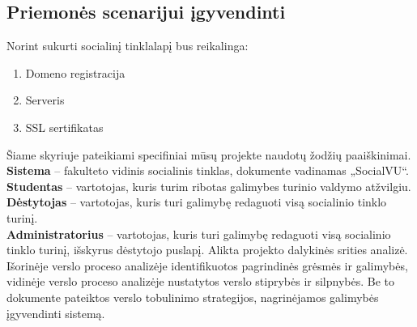 \documentclass{VUMIFPSkursinis}
\begin{document}
\subsection{Priemonės scenarijui įgyvendinti}
Norint sukurti socialinį tinklalapį bus reikalinga:
\begin{enumerate}
	\item Domeno registracija
	\item Serveris
	\item SSL sertifikatas
\end{enumerate}
\newpage
{}
Šiame skyriuje pateikiami specifiniai mūsų projekte naudotų žodžių paaiškinimai. \\
\textbf{Sistema} – fakulteto vidinis socialinis tinklas, dokumente vadinamas „SocialVU“. \\
\textbf{Studentas} – vartotojas, kuris turim ribotas galimybes turinio valdymo atžvilgiu.\\
\textbf{Dėstytojas} – vartotojas, kuris turi galimybę redaguoti visą socialinio tinklo turinį.\\
\textbf{Administratorius} – vartotojas, kuris turi galimybę redaguoti visą socialinio tinklo turinį, išskyrus dėstytojo puslapį.
\newpage
{}
Alikta projekto dalykinės srities analizė. Išorinėje verslo proceso analizėje identifikuotos pagrindinės grėsmės ir galimybės, vidinėje verslo proceso analizėje nustatytos verslo stiprybės ir silpnybės. Be to dokumente pateiktos verslo tobulinimo strategijos, nagrinėjamos galimybės įgyvendinti sistemą.
\end{document}
